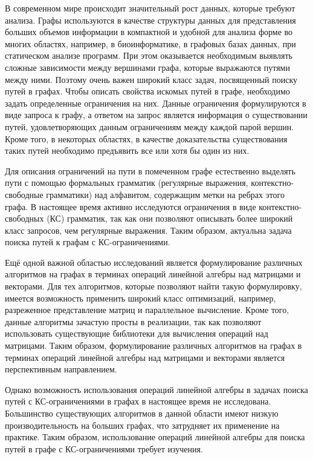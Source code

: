 
{\actuality} 
В современном мире происходит значительный рост данных, которые требуют анализа. Графы используются в качестве структуры данных для представления больших объемов информации в компактной и удобной для анализа форме во многих областях, например, в биоинформатике, в графовых базах данных, при статическом анализе программ. При этом оказывается необходимым выявлять сложные зависимости между вершинами графа, которые выражаются путями между ними. Поэтому очень важен широкий класс задач, посвященный поиску путей в графах. Чтобы описать свойства искомых путей в графе, необходимо задать определенные ограничения на них. Данные ограничения формулируются в виде запроса к графу, а ответом на запрос является информация о существовании путей, удовлетворяющих данным ограничениям между каждой парой вершин. Кроме того, в некоторых областях, в качестве доказательства существования таких путей необходимо предъявить все или хотя бы один из них.

Для описания ограничений на пути в помеченном графе естественно выделять пути с помощью формальных грамматик (регулярные выражения, контекстно-свободные грамматики) над алфавитом, содержащим метки на ребрах этого графа. В настоящее время активно исследуются ограничения в виде контекстно-свободных (КС) грамматик, так как они позволяют описывать более широкий класс запросов, чем регулярные выражения. Таким образом, актуальна задача поиска путей к графам с КС-ограничениями.

Ещё одной важной областью исследований является формулирование различных алгоритмов на графах в терминах операций линейной алгебры над матрицами и векторами. Для тех алгоритмов, которые позволяют найти такую формулировку, имеется возможность применить широкий класс оптимизаций, например, разреженное представление матриц и параллельное вычисление. Кроме того, данные алгоритмы зачастую просты в реализации, так как позволяют использовать существующие библиотеки для вычисления операций над матрицами. Таким образом, формулирование различных алгоритмов на графах в терминах операций линейной алгебры над матрицами и векторами является перспективным направлением.

Однако возможность использования операций линейной алгебры в задачах поиска путей с КС-ограничениями в графах в настоящее время не исследована. Большинство существующих алгоритмов в данной области имеют низкую производительность на больших графах, что затрудняет их применение на практике. Таким образом, использование операций линейной алгебры для поиска путей в графе с КС-ограничениями требует изучения.

